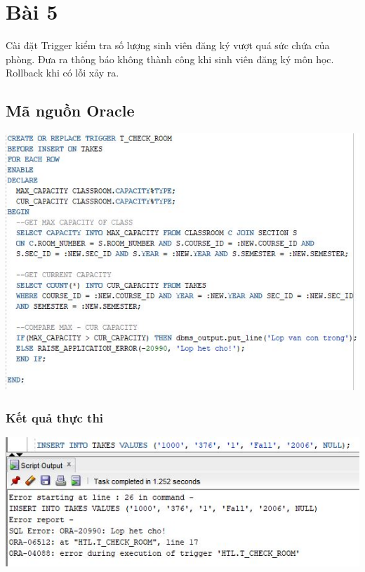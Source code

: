\documentclass[12pt,a4paper]{report}
\begin{document}
\section{Bài 5}
\begin{boxedminipage}[t]{15.5cm}
Cài đặt Trigger kiểm tra số lượng sinh viên đăng ký vượt quá sức chứa của phòng.
Đưa ra thông báo không thành công khi sinh viên đăng ký môn học. Rollback khi có lỗi xảy
ra.	
\end{boxedminipage}

\subsection{Mã nguồn Oracle}
\includegraphics[scale=1]{b5o}
\subsubsection{Kết quả thực thi}
\includegraphics[scale=1]{kb5o}
\end{document}
